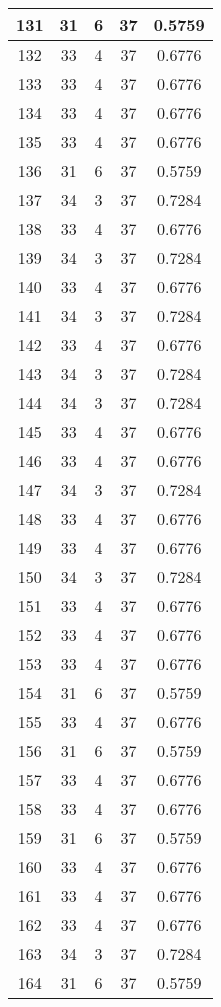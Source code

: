 \documentclass[letterpaper, 12pt]{article}
\begin{document}
\begin{longtable}{|c|c|c|c|c|}
\hline
131 & 31 & 6 & 37 & 0.5759 \\
\hline
132 & 33 & 4 & 37 & 0.6776 \\
\hline
133 & 33 & 4 & 37 & 0.6776 \\
\hline
134 & 33 & 4 & 37 & 0.6776 \\
\hline
135 & 33 & 4 & 37 & 0.6776 \\
\hline
136 & 31 & 6 & 37 & 0.5759 \\
\hline
137 & 34 & 3 & 37 & 0.7284 \\
\hline
138 & 33 & 4 & 37 & 0.6776 \\
\hline
139 & 34 & 3 & 37 & 0.7284 \\
\hline
140 & 33 & 4 & 37 & 0.6776 \\
\hline
141 & 34 & 3 & 37 & 0.7284 \\
\hline
142 & 33 & 4 & 37 & 0.6776 \\
\hline
143 & 34 & 3 & 37 & 0.7284 \\
\hline
144 & 34 & 3 & 37 & 0.7284 \\
\hline
145 & 33 & 4 & 37 & 0.6776 \\
\hline
146 & 33 & 4 & 37 & 0.6776 \\
\hline
147 & 34 & 3 & 37 & 0.7284 \\
\hline
148 & 33 & 4 & 37 & 0.6776 \\
\hline
149 & 33 & 4 & 37 & 0.6776 \\
\hline
150 & 34 & 3 & 37 & 0.7284 \\
\hline
151 & 33 & 4 & 37 & 0.6776 \\
\hline
152 & 33 & 4 & 37 & 0.6776 \\
\hline
153 & 33 & 4 & 37 & 0.6776 \\
\hline
154 & 31 & 6 & 37 & 0.5759 \\
\hline
155 & 33 & 4 & 37 & 0.6776 \\
\hline
156 & 31 & 6 & 37 & 0.5759 \\
\hline
157 & 33 & 4 & 37 & 0.6776 \\
\hline
158 & 33 & 4 & 37 & 0.6776 \\
\hline
159 & 31 & 6 & 37 & 0.5759 \\
\hline
160 & 33 & 4 & 37 & 0.6776 \\
\hline
161 & 33 & 4 & 37 & 0.6776 \\
\hline
162 & 33 & 4 & 37 & 0.6776 \\
\hline
163 & 34 & 3 & 37 & 0.7284 \\
\hline
164 & 31 & 6 & 37 & 0.5759 \\

\end{longtable}
\end{document}
